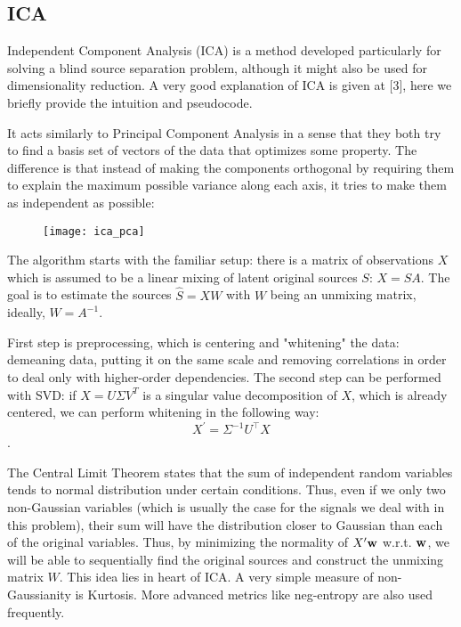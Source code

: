 \documentclass[../main.tex]{subfiles} %
\begin{document}
\subsection{ICA}

Independent Component Analysis (ICA) is a method developed particularly for solving a blind source separation problem, although it might also be used for dimensionality reduction. 
A very good explanation of ICA is given at [3], here we briefly provide the intuition and pseudocode.

It acts similarly to Principal Component Analysis in a sense that they both try to find a basis set of vectors of the data that optimizes some property. 
The difference is that instead of making the components orthogonal by requiring them to explain the maximum possible variance along each axis, it tries to make them as independent as possible:

\begin{figure}[!h]
	\centering
	\texttt{[image: ica\_pca]}
\end{figure}

The algorithm starts with the familiar setup: there is a matrix of observations $X$ which is assumed to be a linear mixing of latent original sources $S$: $X = S A$. 
The goal is to estimate the sources $\hat S = X W$ with $W$ being an unmixing matrix, ideally, $W = A^{-1}$.

First step is preprocessing, which is centering and "whitening" the data: demeaning data, putting it on the same scale and removing correlations in order to deal only with higher-order dependencies.
The second step can be performed with SVD: if $X = U \Sigma V^T$ is a singular value decomposition of $X$, which is already centered, we can perform whitening in the following way: \[X^\prime = \Sigma^{-1} U^\top  X\].

The Central Limit Theorem states that the sum of independent random variables tends to normal distribution under certain conditions. 
Thus, even if we only two non-Gaussian variables (which is usually the case for the signals we deal with in this problem), their sum will have the distribution closer to Gaussian than each of the original variables. 
Thus, by minimizing the normality of $X^\prime {\mathbf w}$ w.r.t. ${\mathbf w}$, we will be able to sequentially find the original sources and construct the unmixing matrix $W$.
This idea lies in heart of ICA.
A very simple measure of non-Gaussianity is Kurtosis. 
More advanced metrics like neg-entropy are also used frequently.
\end{document}
